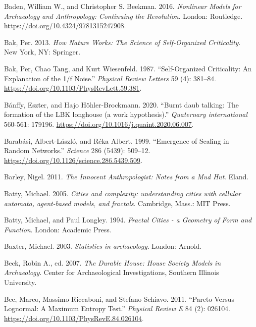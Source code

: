 \documentclass[
  12pt,
  a4paper, twoside]{book}
\newlength{\cslhangindent}
\newlength{\cslentryspacingunit} %
\newenvironment{CSLReferences}[2] %
 {%
  \setlength{\parindent}{0pt}
  \ifodd #1
  \let\oldpar\par
  \def\par{\hangindent=\cslhangindent\oldpar}
  \fi
  \setlength{\parskip}{#2\cslentryspacingunit}
 }%
 {}
\begin{document}
\begin{CSLReferences}{1}{0}
\leavevmode{}%
Baden, William W., and Christopher S. Beekman. 2016. \emph{Nonlinear Models for Archaeology and Anthropology: Continuing the Revolution}. London: Routledge. \url{https://doi.org/10.4324/9781315247908}.

\leavevmode{}%
Bak, Per. 2013. \emph{How {Nature Works}: {The Science} of {Self-Organized Criticality}}. {New York, NY}: {Springer}.

\leavevmode{}%
Bak, Per, Chao Tang, and Kurt Wiesenfeld. 1987. {``Self-Organized Criticality: {An} Explanation of the 1/f Noise.''} \emph{Physical Review Letters} 59 (4): 381--84. \url{https://doi.org/10.1103/PhysRevLett.59.381}.

\leavevmode{}%
Bánffy, Eszter, and Hajo Höhler-Brockmann. 2020. {``Burnt daub talking: The formation of the LBK longhouse (a work hypothesis).''} \emph{Quaternary international} 560-561: 179196. \url{https://doi.org/10.1016/j.quaint.2020.06.007}.

\leavevmode{}%
Barabási, Albert-László, and Réka Albert. 1999. {``Emergence of Scaling in Random Networks.''} \emph{Science} 286 (5439): 509--12. \url{https://doi.org/10.1126/science.286.5439.509}.

\leavevmode{}%
Barley, Nigel. 2011. \emph{The Innocent Anthropologist: Notes from a Mud Hut}. Eland.

\leavevmode{}%
Batty, Michael. 2005. \emph{Cities and complexity: understanding cities with cellular automata, agent-based models, and fractals}. Cambridge, Mass.: MIT Press.

\leavevmode{}%
Batty, Michael, and Paul Longley. 1994. \emph{Fractal Cities - a Geometry of Form and Function}. London: Academic Press.

\leavevmode{}%
Baxter, Michael. 2003. \emph{Statistics in archaeology}. London: Arnold.

\leavevmode{}%
Beck, Robin A., ed. 2007. \emph{The Durable House: House Society Models in Archaeology}. Center for Archaeological Investigations, Southern Illinois University.

\leavevmode{}%
Bee, Marco, Massimo Riccaboni, and Stefano Schiavo. 2011. {``Pareto Versus Lognormal: A Maximum Entropy Test.''} \emph{Physical Review E} 84 (2): 026104. \url{https://doi.org/10.1103/PhysRevE.84.026104}.


\end{CSLReferences}
\end{document}
